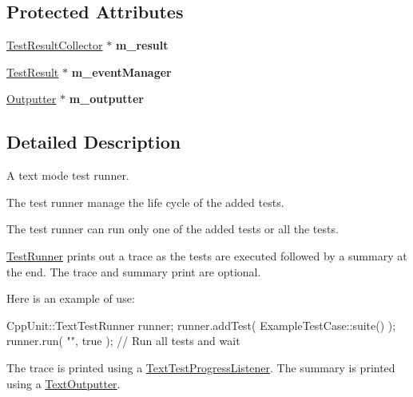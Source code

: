 \subsection*{Protected Attributes}
\begin{DoxyCompactItemize}
\item 
\hypertarget{class_text_test_runner_a61cf52af4ee1c64e0e8d07fe86b91ea7}{\hyperlink{class_test_result_collector}{Test\-Result\-Collector} $\ast$ {\bfseries m\-\_\-result}}\label{class_text_test_runner_a61cf52af4ee1c64e0e8d07fe86b91ea7}

\item 
\hypertarget{class_text_test_runner_acfe13b2f69c0113670e3ba72704c0cf5}{\hyperlink{class_test_result}{Test\-Result} $\ast$ {\bfseries m\-\_\-event\-Manager}}\label{class_text_test_runner_acfe13b2f69c0113670e3ba72704c0cf5}

\item 
\hypertarget{class_text_test_runner_a01e4b671a1e8a32781ef6bcb91e4e95e}{\hyperlink{class_outputter}{Outputter} $\ast$ {\bfseries m\-\_\-outputter}}\label{class_text_test_runner_a01e4b671a1e8a32781ef6bcb91e4e95e}

\end{DoxyCompactItemize}


\subsection{Detailed Description}
A text mode test runner.

The test runner manage the life cycle of the added tests. 

The test runner can run only one of the added tests or all the tests.

\hyperlink{class_test_runner}{Test\-Runner} prints out a trace as the tests are executed followed by a summary at the end. The trace and summary print are optional.

Here is an example of use\-:


\begin{DoxyCode}
CppUnit::TextTestRunner runner;
runner.addTest( ExampleTestCase::suite() );
runner.run( \textcolor{stringliteral}{""}, \textcolor{keyword}{true} );    \textcolor{comment}{// Run all tests and wait}
\end{DoxyCode}


The trace is printed using a \hyperlink{class_text_test_progress_listener}{Text\-Test\-Progress\-Listener}. The summary is printed using a \hyperlink{class_text_outputter}{Text\-Outputter}.


